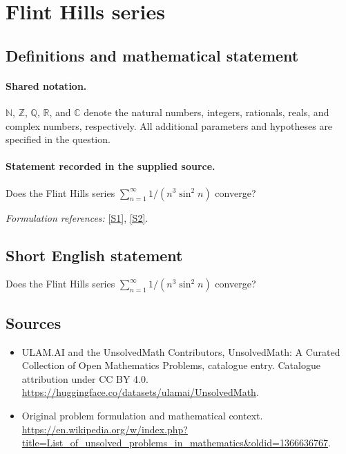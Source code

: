 \documentclass[11pt]{article}
\newcommand{\sref}[2]{\hyperlink{source:#1:#2}{[S#2]}}
\begin{document}
\section{Flint Hills series}\label{statement}

\subsection{Definitions and mathematical statement}

\paragraph{Shared notation.}$\mathbb N$, $\mathbb Z$, $\mathbb Q$, $\mathbb R$, and $\mathbb C$ denote the natural numbers, integers, rationals, reals, and complex numbers, respectively. All additional parameters and hypotheses are specified in the question.


\paragraph{Statement recorded in the supplied source.}
Does the Flint Hills series $\sum_{n=1}^{\infty} 1/(n^3\sin^2 n)$ converge?
\par\smallskip\textit{Formulation references:} \sref{statement}{1}, \sref{statement}{2}.
\subsection{Short English statement}
Does the Flint Hills series $\sum_{n=1}^{\infty} 1/(n^3\sin^2 n)$ converge?
\subsection{Sources}
\begin{itemize}
\item[\hypertarget{source:statement:1}{S1}] ULAM.AI and the UnsolvedMath Contributors, UnsolvedMath: A Curated Collection of Open Mathematics Problems, catalogue entry. Catalogue attribution under CC BY 4.0.
\url{https://huggingface.co/datasets/ulamai/UnsolvedMath}.
\item[\hypertarget{source:statement:2}{S2}] Original problem formulation and mathematical context.
\url{https://en.wikipedia.org/w/index.php?title=List_of_unsolved_problems_in_mathematics&oldid=1366636767}.
\end{itemize}
\label{end:statement}
\end{document}
